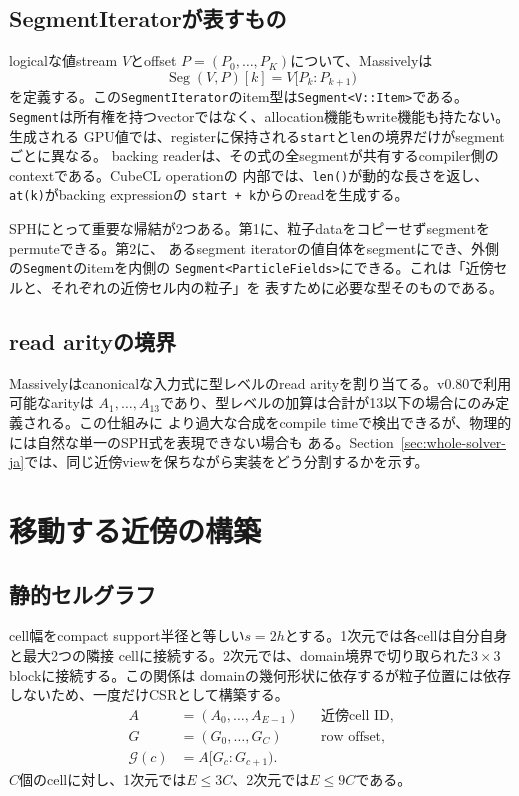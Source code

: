 \documentclass[a4paper,10pt]{ltjsarticle}
\newcommand{\code}[1]{\texttt{#1}}
\newcommand{\Seg}{\operatorname{Seg}}
\begin{document}
\subsection{SegmentIteratorが表すもの}

logicalな値stream $V$とoffset $P=(P_0,\ldots,P_K)$について、Massivelyは
\begin{equation}
 \Seg(V,P)[k] = V[P_k:P_{k+1})
 \label{eq:segment-ja}
\end{equation}
を定義する。この\code{SegmentIterator}のitem型は\code{Segment<V::Item>}である。
\code{Segment}は所有権を持つvectorではなく、allocation機能もwrite機能も持たない。生成される
GPU値では、registerに保持される\code{start}と\code{len}の境界だけがsegmentごとに異なる。
backing readerは、その式の全segmentが共有するcompiler側のcontextである。CubeCL operationの
内部では、\code{len()}が動的な長さを返し、\code{at(k)}がbacking expressionの
\code{start + k}からのreadを生成する。

SPHにとって重要な帰結が2つある。第1に、粒子dataをコピーせずsegmentをpermuteできる。第2に、
あるsegment iteratorの値自体をsegmentにでき、外側の\code{Segment}のitemを内側の
\code{Segment<ParticleFields>}にできる。これは「近傍セルと、それぞれの近傍セル内の粒子」を
表すために必要な型そのものである。

\subsection{read arityの境界}

Massivelyはcanonicalな入力式に型レベルのread arityを割り当てる。v0.80で利用可能なarityは
$A_1,\ldots,A_{13}$であり、型レベルの加算は合計が13以下の場合にのみ定義される。この仕組みに
より過大な合成をcompile timeで検出できるが、物理的には自然な単一のSPH式を表現できない場合も
ある。Section~\ref{sec:whole-solver-ja}では、同じ近傍viewを保ちながら実装をどう分割するかを示す。

\section{移動する近傍の構築}

\subsection{静的セルグラフ}

cell幅をcompact support半径と等しい$s=2h$とする。1次元では各cellは自分自身と最大2つの隣接
cellに接続する。2次元では、domain境界で切り取られた$3\times3$ blockに接続する。この関係は
domainの幾何形状に依存するが粒子位置には依存しないため、一度だけCSRとして構築する。
\begin{align}
 A &= (A_0,\ldots,A_{E-1}) &&\text{近傍cell ID},\\
 G &= (G_0,\ldots,G_C) &&\text{row offset},\\
 \mathcal{G}(c) &= A[G_c:G_{c+1}).
\end{align}
$C$個のcellに対し、1次元では$E\le3C$、2次元では$E\le9C$である。
\end{document}
